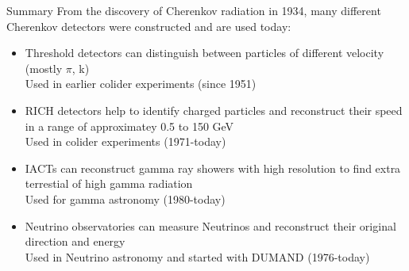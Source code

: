 \documentclass[aspectratio=1610, 10pt]{beamer}
\begin{document}
\begin{frame}{Summary}
From the discovery of Cherenkov radiation in 1934, many different Cherenkov detectors were constructed and are used today:
   \medskip
 \begin{itemize}
   \item Threshold detectors can distinguish between particles of different velocity (mostly $\pi$, k) \\
   \rightarrow Used in earlier colider experiments (since 1951)
   \medskip
   \item RICH detectors help to identify charged particles and reconstruct their speed in a range of approximatey 0.5 to 150 GeV \\
   \rightarrow Used in colider experiments (1971-today)
   \medskip
   \item IACTs can reconstruct gamma ray showers with high resolution to find extra terrestial of high gamma radiation \\
   \rightarrow Used for gamma astronomy (1980-today)
   \medskip
   \item Neutrino observatories can measure Neutrinos and reconstruct their original direction and energy \\
   \rightarrow Used in Neutrino astronomy and started with DUMAND (1976-today)
 \end{itemize}
\end{frame}
\end{document}
